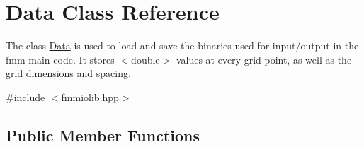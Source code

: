 \hypertarget{class_data}{}\section{Data Class Reference}
\label{class_data}


The class \hyperlink{class_data}{Data} is used to load and save the binaries used for input/output in the fmm main code. It stores $<$double$>$ values at every grid point, as well as the grid dimensions and spacing.  




{\ttfamily \#include $<$fmmiolib.\+hpp$>$}

\subsection*{Public Member Functions}
